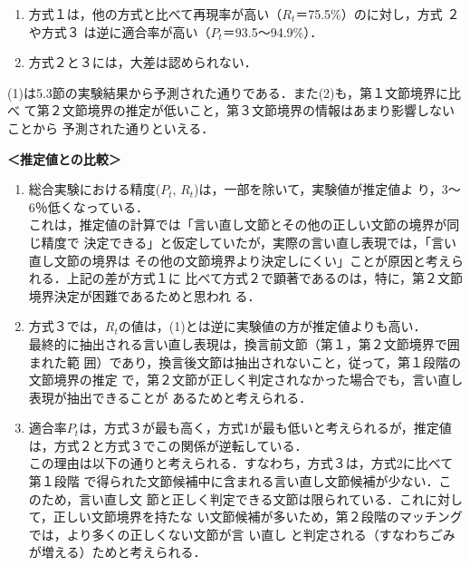 \smallskip{}
\smallskip
\begin{enumerate}
\item 方式１は，他の方式と比べて再現率が高い（$R_t$＝75.5\%）のに対し，方式
２や方式３\break
は逆に適合率が高い（$P_t$＝93.5〜94.9\%）．
\item 方式２と３には，大差は認められない．
\end{enumerate}
\smallskip

(1)は5.3節の実験結果から予測された通りである．また(2)も，第１文節境界に比べ
て第２文節境界の推定が低いこと，第３文節境界の情報はあまり影響しないことから
予測された通りといえる．

\begin{flushleft}
  \bf ＜推定値との比較＞
\end{flushleft}

\begin{enumerate}
\item 総合実験における精度($P_t$, $R_t$)は，一部を除いて，実験値が推定値よ
り，3〜6％低くなっている．
\\[\LH]
\hspace*{2ex}
これは，推定値の計算では「言い直し文節とその他の正しい文節の境界が同じ精度で
決定できる」と仮定していたが，実際の言い直し表現では，「言い直し文節の境界は
その他の文節境界より決定しにくい」ことが原因と考えられる．上記の差が方式１に
比べて方式２で顕著であるのは，特に，第２文節境界決定が困難であるためと思われ
る．

\item 方式３では，$R_t$の値は，(1)とは逆に実験値の方が推定値よりも高い．
\\[\LH]
\hspace*{2ex}
最終的に抽出される言い直し表現は，換言前文節（第１，第２文節境界で囲まれた範
囲）であり，換言後文節は抽出されないこと，従って，第１段階の文節境界の推定
で，第２文節が正しく判定されなかった場合でも，言い直し表現が抽出できることが
あるためと考えられる．

\item 適合率$P_t$は，方式３が最も高く，方式1が最も低いと考えられるが，推定値
は，方式２と方式３でこの関係が逆転している．
\\[\LH]
\hspace*{2ex}
この理由は以下の通りと考えられる．すなわち，方式３は，方式2に比べて第１段階
で得られた文節候補中に含まれる言い直し文節候補が少ない．このため，言い直し文
節と正しく判定できる文節は限られている．これに対して，正しい文節境界を持たな
い文節候補が多いため，第２段階のマッチングでは，より多くの正しくない文節が言
い直し
と判定される（すなわちごみが増える）ためと考えられる．
\end{enumerate}
\medskip

